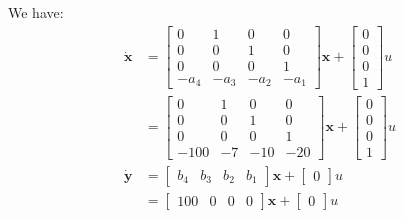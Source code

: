 We have:
\begin{equation}
    \begin{aligned}
        \dot{\textbf{x}} &=
        \begin{bmatrix}
            0    & 1    & 0    & 0\\
            0    & 0    & 1    & 0\\
            0    & 0    & 0    & 1\\
            -a_4 & -a_3 & -a_2 & -a_1
        \end{bmatrix}
        \textbf{x} + 
        \begin{bmatrix}
            0 \\ 0 \\ 0 \\ 1
        \end{bmatrix}
        u \\ &=
        \begin{bmatrix}
            0    & 1    & 0    & 0\\
            0    & 0    & 1    & 0\\
            0    & 0    & 0    & 1\\
            -100 & -7   & -10  & -20
        \end{bmatrix}
        \textbf{x} + 
        \begin{bmatrix}
            0 \\ 0 \\ 0 \\ 1
        \end{bmatrix}
        u \\
        \dot{\textbf{y}} &=
        \begin{bmatrix}
            b_4 & b_3 & b_2 & b_1
        \end{bmatrix}
        \textbf{x} + 
        \begin{bmatrix}
            0
        \end{bmatrix}
        u \\ &=
        \begin{bmatrix}
            100 & 0 & 0 & 0
        \end{bmatrix}
        \textbf{x} + 
        \begin{bmatrix}
            0
        \end{bmatrix}
        u
    \end{aligned}
\end{equation}

